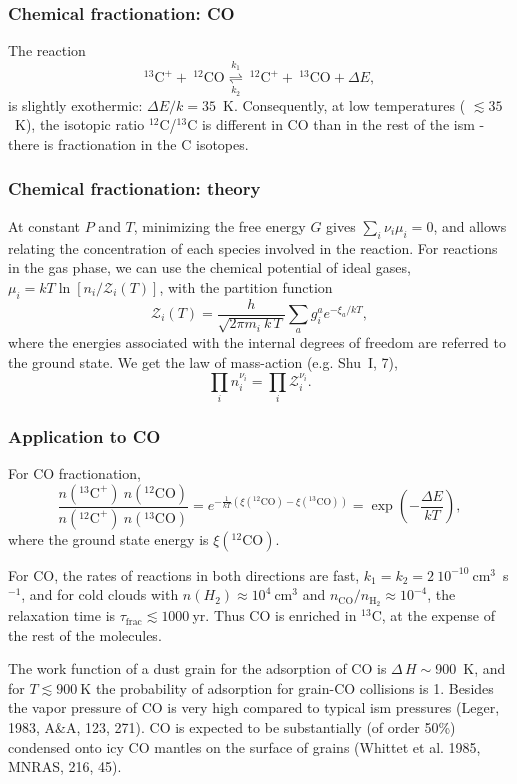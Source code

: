  \begin{frame}\frametitle{ Chemical fractionation: CO}


The reaction \[ ^{13}\mathrm{C}^{+} + ~^{12}\mathrm{CO}
\overset{k_1}{\underset{k_2}{\rightleftharpoons}} ~^{12}\mathrm{C}^{+}
+ ~^{13}\mathrm{CO} + \Delta E, \]is slightly exothermic: $\Delta E /
k = 35$~K. Consequently, at low temperatures ( $\lesssim 35$~K), the
isotopic ratio $^{12}$C/$^{13}$C is different in CO than in the rest
of the {\sc ism} - there is fractionation in the C isotopes.

\end{frame} \begin{frame}\frametitle{ Chemical fractionation: theory}


At constant $P$ and $T$, minimizing the free energy $G$ gives $
\sum_i \nu_i \mu_i = 0$, and allows relating the concentration of each
species involved in the reaction. For reactions in the gas phase, we
can use the chemical potential of ideal gases,
$ \mu_i = k T \ln \left[ n_i / {\mathcal{Z}_i(T)} \right]$, 
with the partition function  \[\mathcal{Z}_i(T) = \frac{h}{\sqrt{2 \pi m_i
~k\,T}} \sum_a g^a_i e^{-\xi_a/kT}, \] where the energies associated
with the internal degrees of freedom are referred to the ground
state. We get the law of mass-action (e.g. Shu~I, 7), \[
\prod_i n_i^{\nu_i} = \prod_i \mathcal{Z}_i^{\nu_i}   .\]


\end{frame} \begin{frame}\frametitle{Application to CO} 

For CO fractionation,
\[  \frac{n(^{13}\mathrm{C}^{+}) ~n(^{12}\mathrm{CO})}{ n(^{12}\mathrm{C}^{+})
  ~n(^{13}\mathrm{CO})} = e^ {- \frac{1}{kT} \left(
  \xi(^{12}\mathrm{CO}) - \xi(^{13}\mathrm{CO} ) \right)} = \exp\left(
  -\frac{\Delta E}{kT} \right) , \] where the ground state energy is  $\xi(^{12}\mathrm{CO})$.

For CO, the rates of reactions in both directions are fast, $k_1 = k_2
= 2~10^{-10}~$cm$^3$~s$^{-1}$, and for cold clouds with  $n(H_2)
\approx 10^{4}~$cm$^3$ and $n_\mathrm{CO}/n_\mathrm{H_2} \approx
10^{-4}$, the relaxation time is $\tau_\mathrm{frac} \lesssim
1000~$yr. Thus CO is enriched in $^{13}$C, at the expense of the rest
of the molecules.

The work function of a dust grain for the adsorption of CO is
$\Delta\,H\sim$900~K, and for $T \lesssim 900~$K the probability of
adsorption for grain-CO collisions is 1. Besides the vapor pressure of
CO is very high compared to typical {\sc ism} pressures (Leger, 1983,
A\&A, 123, 271). CO is expected to be substantially (of order 50\%)
condensed onto icy CO mantles on the surface of grains (Whittet et
al. 1985, MNRAS, 216, 45).




\end{frame}
